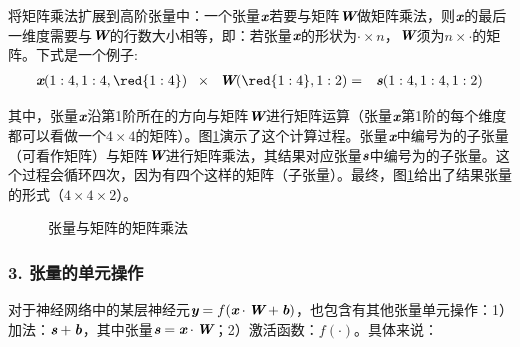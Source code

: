 \parinterval 将矩阵乘法扩展到高阶张量中：一个张量${\textbf{\em x}}$若要与矩阵$ {\textbf{\em W}}$做矩阵乘法，则$ {\textbf{\em x}} $的最后一维度需要与${\textbf{\em W}}$的行数大小相等，即：若张量${\textbf{\em x}} $的形状为$ \cdot \times n $，${\textbf{\em W}} $须为$ n\times \cdot $的矩阵。下式是一个例子:
\begin{eqnarray}
{\mathbi{x}}(1:4,1:4,{\red{1:4}})\;\;\times\;\; {{\mathbi{W}}({\red{1:4}},1:2)}&=&{\mathbi{s}}(1:4,1:4,1:2)
\label{eq:9-25}
\end{eqnarray}

\noindent 其中，张量${\textbf{\em x}} $沿第1阶所在的方向与矩阵$ {\textbf{\em W}}$进行矩阵运算（张量${\textbf{\em x}}$第1阶的每个维度都可以看做一个$ 4\times 4 $的矩阵）。图\ref{fig:9-27}演示了这个计算过程。张量${\textbf{\em x}}$中编号为的子张量（可看作矩阵）与矩阵${\textbf{\em W}}$进行矩阵乘法，其结果对应张量$ {\textbf{\em s}}$中编号为的子张量。这个过程会循环四次，因为有四个这样的矩阵（子张量）。最终，图\ref{fig:9-27}给出了结果张量的形式（$ 4 \times 4 \times 2 $）。

\begin{figure}[htp]
\centering

\caption{张量与矩阵的矩阵乘法}
\label{fig:9-27}
\end {figure}


\subsubsection{3. 张量的单元操作}
\vspace{0.5em}

\parinterval 对于神经网络中的某层神经元$ {\textbf{\em y}}=f({\textbf{\em x}}\cdot {\textbf{\em W}}+{\textbf{\em b}}) $，也包含有其他张量单元操作：1）加法：$ {\textbf{\em s}}+{\textbf{\em b}}$，其中张量$ {\textbf{\em s}}={\textbf{\em x}}\cdot {\textbf{\em W}} $；2）激活函数：$ f(\cdot) $。具体来说：

